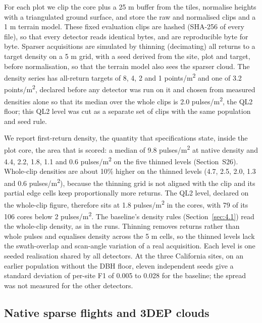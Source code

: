 \documentclass[preprint,12pt,authoryear,a4paper]{elsarticle}
\begin{document}
For each plot we clip the core plus a 25 m buffer from the tiles, normalise
heights with a triangulated ground surface, and store the raw and normalised
clips and a 1 m terrain model. These fixed evaluation clips are hashed (SHA-256
of every file), so that every detector reads identical bytes, and are
reproducible byte for byte. Sparser acquisitions are simulated by thinning
(decimating) all returns to a target density on a 5 m grid, with a seed derived
from the site, plot and target, before normalisation, so that the terrain model
also sees the sparser cloud. The density series has all-return targets of 8, 4,
2 and 1 points/m\textsuperscript{2} and one of 3.2 points/m\textsuperscript{2}, declared before any detector was run
on it and chosen from measured densities alone so that its median over the whole
clips is 2.0 pulses/m\textsuperscript{2}, the QL2 floor; this QL2 level was cut as a separate set
of clips with the same population and seed rule.

We report first-return density, the quantity that specifications state, inside
the plot core, the area that is scored: a median of 9.8 pulses/m\textsuperscript{2} at native
density and 4.4, 2.2, 1.8, 1.1 and 0.6 pulses/m\textsuperscript{2} on the five thinned levels
(Section~S26). Whole-clip densities are about 10\% higher on the thinned levels
(4.7, 2.5, 2.0, 1.3 and 0.6 pulses/m\textsuperscript{2}), because the thinning grid is not aligned
with the clip and its partial edge cells keep proportionally more returns. The
QL2 level, declared on the whole-clip figure, therefore sits at 1.8 pulses/m\textsuperscript{2} in
the cores, with 79 of its 106 cores below 2 pulses/m\textsuperscript{2}. The baseline's density
rules (Section~\ref{sec:4.1}) read the whole-clip density, as in the runs. Thinning
removes returns rather than whole pulses and equalises density across the 5 m
cells, so the thinned levels lack the swath-overlap and scan-angle variation of
a real acquisition. Each level is one seeded realisation shared by all
detectors. At the three California sites, on an earlier population without the
DBH floor, eleven independent seeds give a standard deviation of per-site F1 of
0.005 to 0.028 for the baseline; the spread was not measured for the other
detectors.

\subsection{Native sparse flights and 3DEP clouds}\label{sec:3.4}
\end{document}
